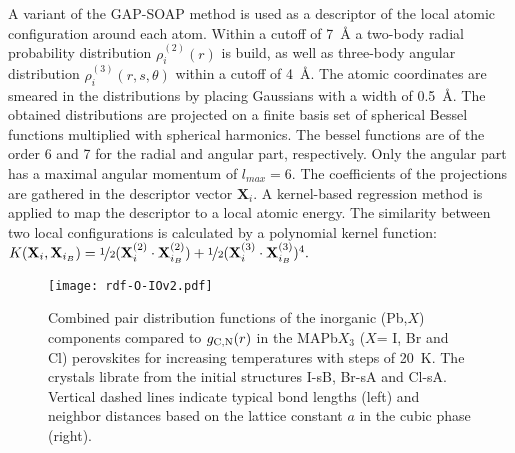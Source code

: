 \documentclass[journal=jpccck,manuscript=article,layout=twocolumn]{achemso}
\begin{document}
A variant of the GAP-SOAP\cite{Bartok:prl10,Bartok:prb13} method is
used as a descriptor of the local atomic configuration around each atom. Within a cutoff of 7~\AA{} a two-body radial probability distribution $\rho^{(2)}_i(r)$ is build, as well as three-body angular distribution $\rho^{(3)}_i(r,s,\theta)$ within a cutoff of 4~\AA{}. The atomic coordinates are smeared in the distributions by placing Gaussians with a width of 0.5~\AA{}. The obtained distributions are projected 
on a finite basis set of spherical Bessel functions multiplied with spherical harmonics. The bessel functions are of the order 6 and 7 for the radial and angular part, respectively. Only the angular part has a  maximal angular momentum of $l_{max}=6$. The
coefficients of the projections are gathered in the descriptor vector $\mathbf{X}_i$. A kernel-based
regression method\cite{Bishop:book06} is applied to map the descriptor to a local atomic energy. The similarity between two local configurations is calculated by a polynomial kernel function: $
   K(\mathbf{X}_i,\mathbf{X}_{i_B})=\nicefrac{1}{2}(\mathbf{X}^{(2)}_i
	     \cdot{}\mathbf{X}^{(2)}_{i_B})+\nicefrac{1}{2}(\mathbf{X}^{(3)}_i\cdot{}
	        \mathbf{X}^{(3)}_{i_B})^4.$
\newline



\begin{figure}
    \begin{center}
    \texttt{[image: rdf-O-IOv2.pdf]}
    \end{center}
   \caption{Combined pair distribution functions of the inorganic (Pb,$X$) components compared to $g_{\rm C,N}(r)$ in the MAPb$X_3$ ($X$= I, Br and Cl) perovskites for increasing temperatures with steps of 20~K. The crystals librate from the initial structures I-sB, Br-sA and Cl-sA. Vertical dashed lines indicate typical bond lengths (left) and neighbor distances based on the lattice constant $a$ in the cubic phase (right).}
\label{fig:rdfintro}
\end{figure}



\end{document}
